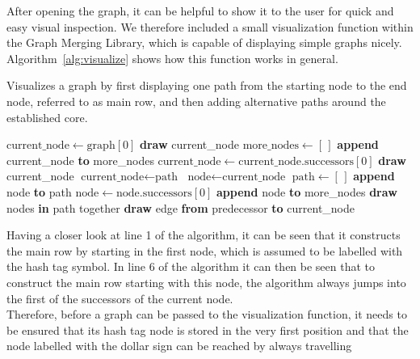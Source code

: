 \documentclass[a4paper,12pt,twoside,BCOR=10mm]{scrbook}
\begin{document}
After opening the graph, it can be helpful to show it to the user for 
quick and easy visual inspection. 
We therefore included a small visualization function within the Graph Merging Library, 
which is capable of displaying simple graphs nicely. 
Algorithm~\ref{alg:visualize} shows how this function works in general. 
\begin{algorithm}
\caption[Visualize a graph]{Visualizes a graph by first displaying one path from 
the starting node to the end node, referred to as main row, 
and then adding alternative paths around the established core.}
\label{alg:visualize}
\begin{algorithmic}[1]
\State $ \textrm{current\_node} \gets \textrm{graph}[0] $
\State \textbf{draw} current\_node
\State $ \textrm{more\_nodes} \gets [ \, ] $
	\State \textbf{append} current\_node \textbf{to} more\_nodes
	\State $ \textrm{current\_node} \gets \textrm{current\_node.successors}[0] $
	\State \textbf{draw} current\_node
\EndWhile
\State \phantom{emptyline}
	\State $ \textrm{current\_node} \gets \textrm{path} $
		\State $ \textrm{node} \gets \textrm{current\_node} $
		\State $ \textrm{path} \gets [ \, ] $
			\State \textbf{append} node \textbf{to} path
			\State $ \textrm{node} \gets \textrm{node.successors}[0] $
				\State \textbf{append} node \textbf{to} more\_nodes
			\EndIf
		\EndWhile
		\State \textbf{draw} nodes \textbf{in} path together
	\EndIf
		\State \textbf{draw} edge \textbf{from} predecessor \textbf{to} current\_node
	\EndFor
\EndFor
\end{algorithmic}
\end{algorithm}
Having a closer look at line 1 of the algorithm, 
it can be seen that it constructs the main row 
by starting in the first node, which is assumed to 
be labelled with the hash tag symbol. 
In line 6 of the algorithm it can then be seen 
that to construct the main row starting with this node, 
the algorithm always jumps into the first of the successors of the current node. \\
Therefore, before a graph can be passed to the visualization function, 
it needs to be ensured that its hash tag node is stored in the very first position 
and that the node labelled with the dollar sign can be reached by always travelling 
\end{document}
